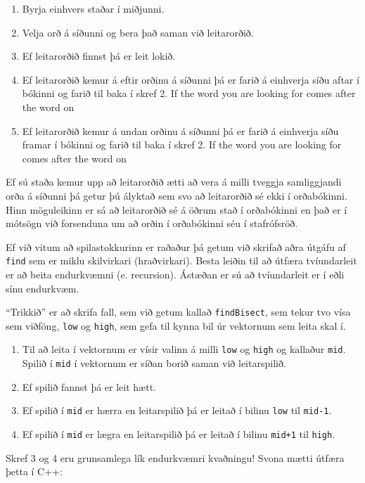 \begin {enumerate}

\item Byrja einhvers staðar í miðjunni. 

\item Velja orð á síðunni og bera það saman við leitarorðið.

\item Ef leitarorðið finnst þá er leit lokið. 

\item Ef leitarorðið kemur á eftir orðinu á síðunni þá er farið á einhverja síðu aftar í bókinni og farið til baka í skref 2. If the word you are looking for comes after the word on

\item Ef leitarorðið kemur á undan orðinu á síðunni þá er farið á einhverja síðu framar í bókinni og farið til baka í skref 2. If the word you are looking for comes after the word on

\end {enumerate}

Ef sú staða kemur upp að leitarorðið ætti að vera á milli tveggja samliggjandi orða á síðunni
þá getur þú ályktað sem svo að leitarorðið sé ekki í orðabókinni.
Hinn möguleikinn er sá að leitarorðið sé á öðrum stað í orðabókinni
en það er í mótsögn við forsenduna um að orðin í orðabókinni séu í stafrófsröð.

Ef við vitum að spilastokkurinn er raðaður þá getum við skrifað aðra útgáfu af {\tt find}
sem er miklu skilvirkari (hraðvirkari).
Besta leiðin til að útfæra tvíundarleit er að beita endurkvæmni (e. recursion).
Ástæðan er sú að tvíundarleit er í eðli sínu endurkvæm.


``Trikkið'' er að skrifa fall, sem við getum kallað {\tt findBisect}, sem tekur tvo vísa sem viðföng,
{\tt low} og {\tt high}, sem gefa til kynna bil úr vektornum sem leita skal í. 

\begin{enumerate}

\item Til að leita í vektornum er vísir valinn á milli {\tt low} og {\tt high} og kallaður {\tt mid}.
Spilið í {\tt mid} í vektornum er síðan borið saman við leitarspilið. 

\item Ef spilið fannst þá er leit hætt. 

\item Ef spilið í {\tt mid} er hærra en leitarspilið þá er leitað í bilinu {\tt low} til {\tt mid-1}.

\item Ef spilið í {\tt mid} er lægra en leitarspilið þá er leitað í bilinu {\tt mid+1} til {\tt high}.

\end{enumerate}
%
Skref 3 og 4 eru grunsamlega lík endurkvæmri kvaðningu!
Svona mætti útfæra þetta í C++:

